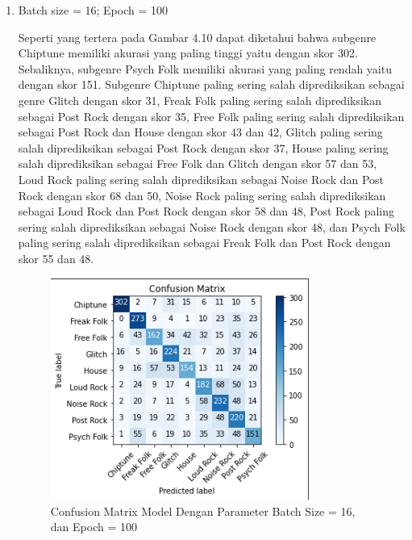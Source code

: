 \begin{enumerate}
	\item Batch size = 16; Epoch = 100
	
	Seperti yang tertera pada Gambar 4.10 dapat diketahui bahwa subgenre Chiptune memiliki akurasi yang paling tinggi yaitu dengan skor 302. Sebaliknya, subgenre Psych Folk memiliki akurasi yang paling rendah yaitu dengan skor 151. Subgenre Chiptune paling sering salah diprediksikan sebagai genre Glitch dengan skor 31, Freak Folk paling sering salah diprediksikan sebagai Post Rock dengan skor 35, Free Folk paling sering salah diprediksikan sebagai Post Rock dan House dengan skor 43 dan 42, Glitch paling sering salah diprediksikan sebagai Post Rock dengan skor 37, House paling sering salah diprediksikan sebagai Free Folk dan Glitch dengan skor 57 dan 53, Loud Rock paling sering salah diprediksikan sebagai Noise Rock dan Post Rock dengan skor 68 dan 50, Noise Rock paling sering salah diprediksikan sebagai Loud Rock dan Post Rock dengan skor 58 dan 48, Post Rock paling sering salah diprediksikan sebagai Noise Rock dengan skor 48, dan Psych Folk paling sering salah diprediksikan sebagai Freak Folk dan Post Rock dengan skor 55 dan 48.
	
	\begin{figure}[H]
		\centering
		
		\includegraphics[width=0.8\textwidth]{gambar/confusion matrix_b16_e100}
		
		\caption{Confusion Matrix Model Dengan Parameter Batch Size = 16, dan Epoch = 100}
		\label{fig:cm_b16_e100}
	\end{figure}


\end{enumerate}

